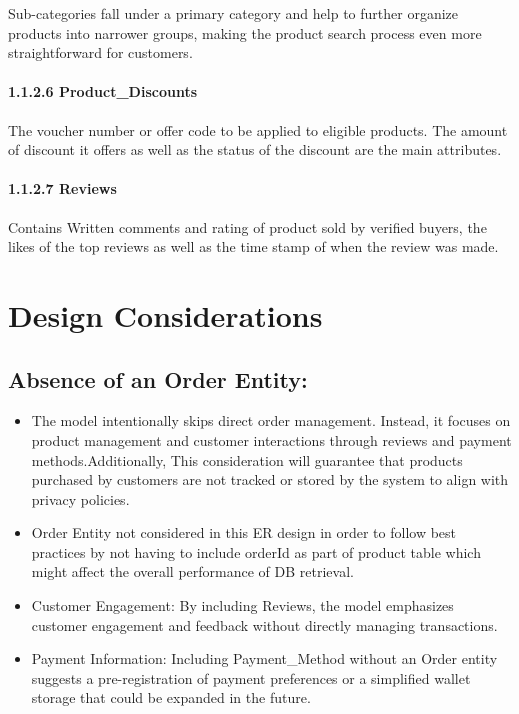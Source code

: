 \documentclass[
]{article}
\begin{document}
Sub-categories fall under a primary category and help to further
organize products into narrower groups, making the product search
process even more straightforward for customers.

\hypertarget{product_discounts}{%
\paragraph{1.1.2.6 Product\_Discounts}\label{product_discounts}}

The voucher number or offer code to be applied to eligible products. The
amount of discount it offers as well as the status of the discount are
the main attributes.

\hypertarget{reviews}{%
\paragraph{1.1.2.7 Reviews}\label{reviews}}

Contains Written comments and rating of product sold by verified buyers,
the likes of the top reviews as well as the time stamp of when the
review was made.

\hypertarget{design-considerations}{%
\section{Design Considerations}\label{design-considerations}}

\hypertarget{absence-of-an-order-entity}{%
\subsection{Absence of an Order
Entity:}\label{absence-of-an-order-entity}}

\begin{itemize}
\item
  The model intentionally skips direct order management. Instead, it
  focuses on product management and customer interactions through
  reviews and payment methods.Additionally, This consideration will
  guarantee that products purchased by customers are not tracked or
  stored by the system to align with privacy policies.
\item
  Order Entity not considered in this ER design in order to follow best
  practices by not having to include orderId as part of product table
  which might affect the overall performance of DB retrieval.
\item
  Customer Engagement: By including Reviews, the model emphasizes
  customer engagement and feedback without directly managing
  transactions.
\item
  Payment Information: Including Payment\_Method without an Order entity
  suggests a pre-registration of payment preferences or a simplified
  wallet storage that could be expanded in the future.
\end{itemize}
\end{document}
